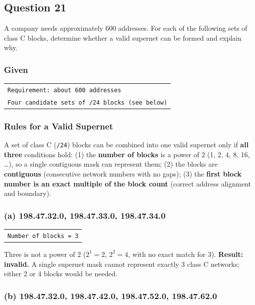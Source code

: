 \documentclass[11pt,a4paper]{article}
\begin{document}
\subsection*{Question 21}

A company needs approximately 600 addresses. For each of the following sets of class C
blocks, determine whether a valid supernet can be formed and explain why.

\subsubsection*{Given}

\begin{tabularx}{\textwidth}{@{}X@{}}
\texttt{Requirement: about 600 addresses} \\
\texttt{Four candidate sets of /24 blocks (see below)} \\
\end{tabularx}

\subsubsection*{Rules for a Valid Supernet}

A set of class C (\texttt{/24}) blocks can be combined into one valid supernet
only if \textbf{all three} conditions hold: (1) the \textbf{number of blocks}
is a power of 2 (1, 2, 4, 8, 16, \ldots), so a single contiguous mask can
represent them; (2) the blocks are \textbf{contiguous} (consecutive network
numbers with no gaps); (3) the \textbf{first block number is an exact multiple
of the block count} (correct address alignment and boundary).

\subsubsection*{(a) 198.47.32.0, 198.47.33.0, 198.47.34.0}

\begin{tabularx}{\textwidth}{@{}X@{}}
\texttt{Number of blocks = 3} \\
\end{tabularx}

Three is not a power of 2 ($2^{1} = 2$, $2^{2} = 4$, with no exact match for 3).
\textbf{Result: invalid.} A single supernet mask cannot represent exactly 3
class C networks; either 2 or 4 blocks would be needed.

\subsubsection*{(b) 198.47.32.0, 198.47.42.0, 198.47.52.0, 198.47.62.0}
\end{document}
